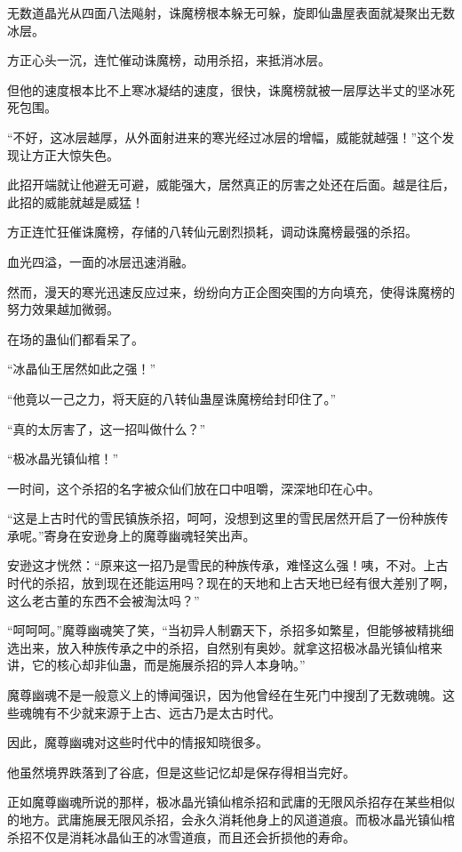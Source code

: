 \begin{this_body}
无数道晶光从四面八法飚射，诛魔榜根本躲无可躲，旋即仙蛊屋表面就凝聚出无数冰层。

方正心头一沉，连忙催动诛魔榜，动用杀招，来抵消冰层。

但他的速度根本比不上寒冰凝结的速度，很快，诛魔榜就被一层厚达半丈的坚冰死死包围。

“不好，这冰层越厚，从外面射进来的寒光经过冰层的增幅，威能就越强！”这个发现让方正大惊失色。

此招开端就让他避无可避，威能强大，居然真正的厉害之处还在后面。越是往后，此招的威能就越是威猛！

方正连忙狂催诛魔榜，存储的八转仙元剧烈损耗，调动诛魔榜最强的杀招。

血光四溢，一面的冰层迅速消融。

然而，漫天的寒光迅速反应过来，纷纷向方正企图突围的方向填充，使得诛魔榜的努力效果越加微弱。

在场的蛊仙们都看呆了。

“冰晶仙王居然如此之强！”

“他竟以一己之力，将天庭的八转仙蛊屋诛魔榜给封印住了。”

“真的太厉害了，这一招叫做什么？”

“极冰晶光镇仙棺！”

一时间，这个杀招的名字被众仙们放在口中咀嚼，深深地印在心中。

“这是上古时代的雪民镇族杀招，呵呵，没想到这里的雪民居然开启了一份种族传承呢。”寄身在安逊身上的魔尊幽魂轻笑出声。

安逊这才恍然：“原来这一招乃是雪民的种族传承，难怪这么强！咦，不对。上古时代的杀招，放到现在还能运用吗？现在的天地和上古天地已经有很大差别了啊，这么老古董的东西不会被淘汰吗？”

“呵呵呵。”魔尊幽魂笑了笑，“当初异人制霸天下，杀招多如繁星，但能够被精挑细选出来，放入种族传承之中的杀招，自然别有奥妙。就拿这招极冰晶光镇仙棺来讲，它的核心却非仙蛊，而是施展杀招的异人本身呐。”

魔尊幽魂不是一般意义上的博闻强识，因为他曾经在生死门中搜刮了无数魂魄。这些魂魄有不少就来源于上古、远古乃是太古时代。

因此，魔尊幽魂对这些时代中的情报知晓很多。

他虽然境界跌落到了谷底，但是这些记忆却是保存得相当完好。

正如魔尊幽魂所说的那样，极冰晶光镇仙棺杀招和武庸的无限风杀招存在某些相似的地方。武庸施展无限风杀招，会永久消耗他身上的风道道痕。而极冰晶光镇仙棺杀招不仅是消耗冰晶仙王的冰雪道痕，而且还会折损他的寿命。


\end{this_body}
